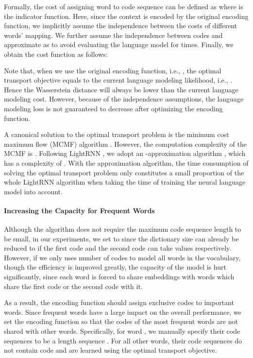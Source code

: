 \documentclass[letterpaper]{article} \usepackage{aaai19}  \usepackage{times}  \usepackage{helvet}  \usepackage{courier}  \usepackage{url}  \usepackage{graphicx}  \frenchspacing  \usepackage{booktabs}
\begin{document}
Formally, the cost of assigning word  to code sequence  can be defined as  where  is the indicator function. Here, since the context is encoded by the original encoding function, we implicitly assume the independence between the costs of  different words' mapping.
We further assume the independence between codes and approximate  as  to avoid evaluating the language model for  times. Finally, we obtain the cost function as follows: 




Note that, when we use the original encoding function, i.e., , the optimal transport objective equals to the current language modeling likelihood, i.e., . Hence the  Wasserstein distance will always be lower than the current language modeling cost. However, because of the independence assumptions, the language modeling loss is not guaranteed to decrease after optimizing the encoding function. 

A canonical solution to the optimal transport problem is the minimum cost maximum flow (MCMF) algorithm \cite{ahuja1993network}. 
However, the computation complexity of the MCMF is . 
Following LightRNN \cite{li2016lightrnn}, we adopt an -approximation algorithm \cite{preis1999linear}, which has a complexity of . 
With the approximation algorithm, the time consumption of solving the optimal transport problem only constitutes a small proportion of the whole LightRNN algorithm when taking the time of training the neural language model into account.

\paragraph{Increasing the Capacity for Frequent Words}
Although the algorithm does not require the maximum code sequence length  to be small, in our experiments, we set  to  since the dictionary size can already be reduced to  if the first code and the second code can take  values respectively. 
However, if we only uses  number of codes to model all words in the vocabulary, though the efficiency is improved greatly, the capacity of the model is hurt significantly, since each word is forced to share embeddings with  words which share the first code or the second code with it. 

As a result, the encoding function should assign exclusive codes to important words. Since frequent words have a large impact on the overall performance, we set the encoding function so that the codes of the most frequent  words are not shared with other words. Specifically, for word , we manually specify their code sequences to be a length  sequence . For all other words, their code sequences do not contain code  and are learned using the optimal transport objective.
\end{document}
